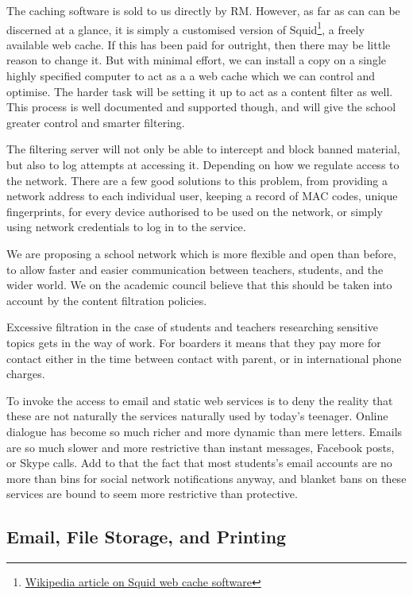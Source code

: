 \documentclass[a4paper,leqno,titlepage]{article}
\begin{document}
The caching software is sold to us directly by RM. However, as far as can can
be discerned at a glance, it is simply a customised version of
Squid\footnote{\href{http://en.wikipedia.org/wiki/Squid_(software)}{Wikipedia article on Squid web cache software}},
a freely available web cache. If this has been paid for outright, then there
may be little reason to change it. But with minimal effort, we can install a
copy on a single highly specified computer to act as a a web cache which we
can control and optimise. The harder task will be setting it up to act as a
content filter as well. This process is well documented and supported though,
and will give the school greater control and smarter filtering.




The filtering server will not only be able to intercept and block banned
material, but also to log attempts at accessing it. Depending on how we regulate
access to the network. There are a few good solutions to this problem,
from providing a network address to each individual user, keeping a record of
MAC codes, unique fingerprints, for every device authorised to be used on the
network, or simply using network credentials to log in to the service.


We are proposing a school network which is more flexible and open than before,
to allow faster and easier communication between teachers, students, and the
wider world. We on the academic council believe that this should be taken into
account by the content filtration policies.


Excessive filtration in the case of students and teachers researching sensitive
topics gets in the way of work. For boarders it means that they pay more for
contact either in the time between contact with parent, or in international
phone charges.


To invoke the access to email and static web services is to deny the reality
that these are not naturally the services naturally used by today's teenager.
Online dialogue has become so much richer and more dynamic than mere letters.
Emails are so much slower and more restrictive than instant messages, Facebook
posts, or Skype calls. Add to that the fact that most students's email accounts
are no more than bins for social network notifications anyway, and blanket
bans on these services are bound to seem more restrictive than protective.



\subsection{Email, File Storage, and Printing}


\end{document}
